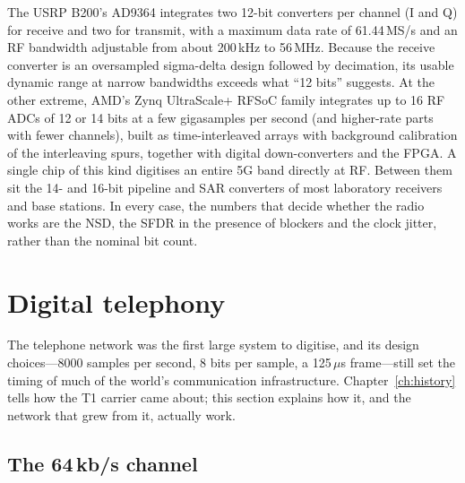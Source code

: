 \begin{inpractice}
The USRP B200's AD9364 integrates two 12-bit converters per channel (I and Q) for receive and two
for transmit, with a maximum data rate of 61.44\,MS/s and an RF bandwidth adjustable from about
200\,kHz to 56\,MHz. Because the receive converter is an oversampled sigma-delta design followed by
decimation, its usable dynamic range at narrow bandwidths exceeds what ``12 bits'' suggests. At
the other extreme, AMD's Zynq UltraScale+ RFSoC family integrates up to 16 RF ADCs of 12 or 14
bits at a few gigasamples per second (and higher-rate parts with fewer channels), built as
time-interleaved arrays with background calibration of the interleaving spurs, together with
digital down-converters and the FPGA. A single chip of this kind digitises an entire 5G band
directly at RF. Between them sit the 14- and 16-bit pipeline and SAR converters of most
laboratory receivers and base stations. In every case, the numbers that decide whether the radio
works are the NSD, the SFDR in the presence of blockers and the clock jitter, rather than the
nominal bit count.
\end{inpractice}


\section{Digital telephony}
\label{sec:ch05:telephony}

The telephone network was the first large system to digitise, and its design choices---8000
samples per second, 8 bits per sample, a 125\,$\mu$s frame---still set the timing of much of the
world's communication infrastructure. Chapter~\ref{ch:history} tells how the T1 carrier came about;
this section explains how it, and the network that grew from it, actually work.

\subsection{The 64\,kb/s channel}

